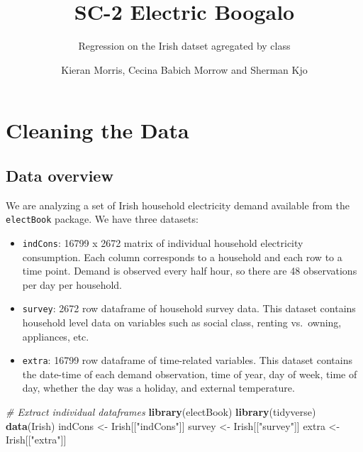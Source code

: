 \documentclass[
]{article}
\title{SC-2 Electric Boogalo}
\subtitle{Regression on the Irish datset agregated by class}
\author{Kieran Morris, Cecina Babich Morrow and Sherman Kjo}
\date{}
\newenvironment{Shaded}{\begin{snugshade}}{\end{snugshade}}
\newcommand{\CommentTok}[1]{\textcolor[rgb]{0.56,0.35,0.01}{\textit{#1}}}
\newcommand{\KeywordTok}[1]{\textcolor[rgb]{0.13,0.29,0.53}{\textbf{#1}}}
\newcommand{\NormalTok}[1]{#1}
\newcommand{\StringTok}[1]{\textcolor[rgb]{0.31,0.60,0.02}{#1}}
\providecommand{\tightlist}{%
  \setlength{\itemsep}{0pt}\setlength{\parskip}{0pt}}
\begin{document}
\maketitle

{
\setcounter{tocdepth}{3}
\tableofcontents
}
\hypertarget{cleaning-the-data}{%
\section{Cleaning the Data}\label{cleaning-the-data}}

\hypertarget{data-overview}{%
\subsection{Data overview}\label{data-overview}}

We are analyzing a set of Irish household electricity demand available
from the \texttt{electBook} package. We have three datasets:

\begin{itemize}
\tightlist
\item
  \texttt{indCons}: 16799 x 2672 matrix of individual household
  electricity consumption. Each column corresponds to a household and
  each row to a time point. Demand is observed every half hour, so there
  are 48 observations per day per household.
\item
  \texttt{survey}: 2672 row dataframe of household survey data. This
  dataset contains household level data on variables such as social
  class, renting vs.~owning, appliances, etc.
\item
  \texttt{extra}: 16799 row dataframe of time-related variables. This
  dataset contains the date-time of each demand observation, time of
  year, day of week, time of day, whether the day was a holiday, and
  external temperature.
\end{itemize}

\begin{Shaded}
\begin{Highlighting}[]
\CommentTok{\# Extract individual dataframes}
\KeywordTok{library}\NormalTok{(electBook)}
\KeywordTok{library}\NormalTok{(tidyverse)}
\KeywordTok{data}\NormalTok{(Irish)}
\NormalTok{indCons \textless{}{-}}\StringTok{ }\NormalTok{Irish[[}\StringTok{"indCons"}\NormalTok{]]}
\NormalTok{survey \textless{}{-}}\StringTok{ }\NormalTok{Irish[[}\StringTok{"survey"}\NormalTok{]]}
\NormalTok{extra \textless{}{-}}\StringTok{ }\NormalTok{Irish[[}\StringTok{"extra"}\NormalTok{]]}
\end{Highlighting}
\end{Shaded}
\end{document}
